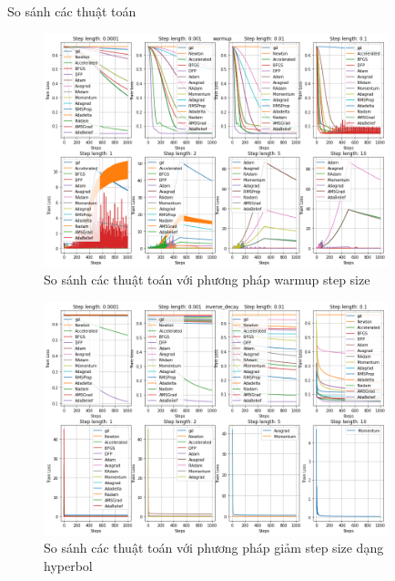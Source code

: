 \documentclass[10pt]{beamer}
\theoremstyle{remark}
\theoremstyle{definition}
\begin{document}
\begin{frame}[allowframebreaks]{So sánh các thuật toán}
	\begin{figure}
		\centering
		\includegraphics[width=10cm]{Thanh/warmup-lr-step-op_step.png}
		\caption{So sánh các thuật toán với phương pháp warmup step size}
	\end{figure}

	\begin{figure}
		\centering
		\includegraphics[width=10cm]{Thanh/inverse-lr-step-op_step.png}
		\caption{So sánh các thuật toán với phương pháp giảm step size dạng hyperbol}
	\end{figure}
\end{frame}
\end{document}
